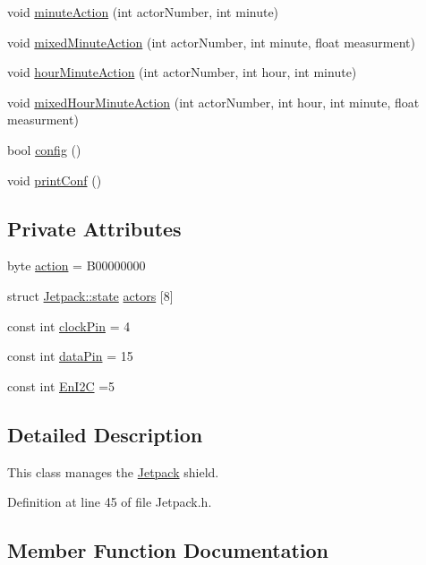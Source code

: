 \begin{DoxyCompactItemize}
\item 
void \hyperlink{class_jetpack_a97da41141c7b53ddee61143519c8d17d}{minute\+Action} (int actor\+Number, int minute)
\item 
void \hyperlink{class_jetpack_acf8ed1fb594b9e8e224f4ed872a8e093}{mixed\+Minute\+Action} (int actor\+Number, int minute, float measurment)
\item 
void \hyperlink{class_jetpack_ae01c13c785ebdf1b0bb5500234aba1bd}{hour\+Minute\+Action} (int actor\+Number, int hour, int minute)
\item 
void \hyperlink{class_jetpack_a273dae1517b56f0242e28b8944edc26b}{mixed\+Hour\+Minute\+Action} (int actor\+Number, int hour, int minute, float measurment)
\item 
bool \hyperlink{class_jetpack_ab065ee83e244265a2223a22f3ee4a719}{config} ()
\item 
void \hyperlink{class_jetpack_ac54a7bb4f9166bee32052253d9b1d306}{print\+Conf} ()
\end{DoxyCompactItemize}
\subsection*{Private Attributes}
\begin{DoxyCompactItemize}
\item 
byte \hyperlink{class_jetpack_aca3142925a7b0834b34ae91d26af7765}{action} = B00000000
\item 
struct \hyperlink{struct_jetpack_1_1state}{Jetpack\+::state} \hyperlink{class_jetpack_a7e16d2f97837f9712a2e6de1c50d99db}{actors} \mbox{[}8\mbox{]}
\item 
const int \hyperlink{class_jetpack_a58ebb991f358f3ae94e82148b0221b5a}{clock\+Pin} = 4
\item 
const int \hyperlink{class_jetpack_a3d669a56e93c71dd25f970d4ed7d0c00}{data\+Pin} = 15
\item 
const int \hyperlink{class_jetpack_a81df984fb4cea98c71aa1a1cfcdfe814}{En\+I2C} =5
\end{DoxyCompactItemize}


\subsection{Detailed Description}
This class manages the \hyperlink{class_jetpack}{Jetpack} shield. 

Definition at line 45 of file Jetpack.\+h.



\subsection{Member Function Documentation}
\mbox{\label{class_jetpack_a5a53e1ebf7aaf3bf3e0d37ea64ca09a7}} 
